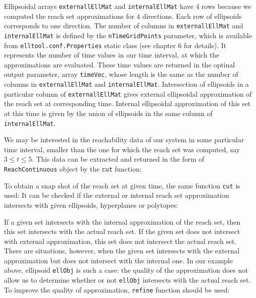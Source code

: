 Ellipsoidal arrays {\tt externallEllMat} and {\tt internalEllMat} have $4$ rows because we computed
the reach set approximations for $4$ directions. Each row of ellipsoids
corresponds to one direction. The number of columns in {\tt externallEllMat} and {\tt internalEllMat}
is defined by the {\tt nTimeGridPoints} parameter, which is available from {\tt elltool.conf.Properties}
static class (see chapter 6 for details). It represents the number of time values
in our time interval, at which the approximations are evaluated. These
time values are returned in the optinal output parameter, array {\tt timeVec},
whose length is the same as the number of columns in {\tt externallEllMat} and {\tt internalEllMat}.
Intersection of ellipsoids in a particular column of {\tt externallEllMat} gives
external ellipsoidal approximation of the reach set at corresponding time.
Internal ellipsoidal approximation of this set at this time is given by the
union of ellipsoids in the same column of {\tt internalEllMat}.

We may be interested in the reachability data of our system in some
particular time interval, smaller than the one for which the reach set was
computed, say $3\leq t\leq5$.
This data can be extracted and returned in the form of {\tt ReachContinuous}
object by the {\tt cut} function:

To obtain a snap shot of the reach set at given time, the same function
{\tt cut} is used:
It can be checked if the external or internal reach set approximation
intersects with given ellipsoids, hyperplanes or polytopes:




If a given set intersects with the internal approximation of the reach set,
then this set intersects with the actual reach set.
If the given set does not
intersect with external approximation, this set does not
intersect the actual reach set. There are situations, however, when the
given set intersects with the external approximation but does not intersect
with the internal one. In our example above, ellipsoid {\tt ellObj} is such a case:
the quality of the approximation does not allow us to determine whether or not
{\tt ellObj} intersects with the actual reach set. To improve the quality
of approximation, {\tt refine} function should be used:

